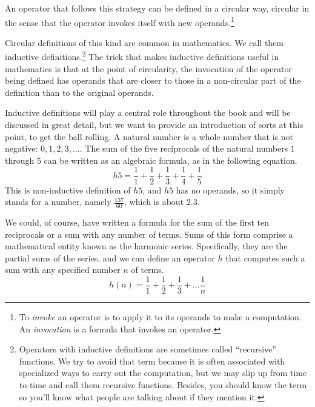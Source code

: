 An operator that follows this strategy can be defined
in a circular way, circular in the sense that
the operator invokes itself with new operands.\footnote{To 
\emph{invoke} 
an operator is to apply it to its operands 
to make a computation.
An \emph{invocation} is a formula that invokes an operator.}

Circular definitions of this kind are common in mathematics.
We call them inductive definitions.\footnote{Operators with
inductive definitions
are sometimes called ``recursive'' functions.
We try to avoid that term because it is
often associated with specialized ways to carry out the computation,
but we may slip up from time to time and call them recursive functions.
Besides, you should know the term so you'll know what people are
talking about if they mention it.}
The trick that makes inductive definitions useful in mathematics
is that at the point of circularity,
the invocation of the operator being defined
has operands that are closer to those in a non-circular part of the
definition than to the original operands.

Inductive definitions
will play a central role throughout the book
and will be discussed in great detail, but we want to provide an
introduction of sorts at this point, to get the ball rolling.
A natural number is a whole number that is not negative: $0, 1, 2, 3, \dots$.
The sum of the five reciprocals of the
natural numbers $1$ through $5$
can be written as an algebraic formula, as in the following equation.
\begin{displaymath}
h5 = \frac{1}{1} + \frac{1}{2} + \frac{1}{3} + \frac{1}{4} + \frac{1}{5}
\end{displaymath}
This is non-inductive definition of $h5$,
and $h5$ has no operands, so it simply stands for a number,
namely $\frac{137}{60}$, which is about $2.3$.

We could, of course, have written a formula for the sum
of the first ten reciprocals or a sum with any number of terms.
Sums of this form comprise a mathematical entity known as
the harmonic series.
Specifically, they are the partial sums of the series,
and we can define an operator $h$ that computes such a sum
with any specified number $n$ of terms.
\begin{displaymath}
h(n) = \frac{1}{1} + \frac{1}{2} + \frac{1}{3} + \dots  \frac{1}{n}
\end{displaymath}

